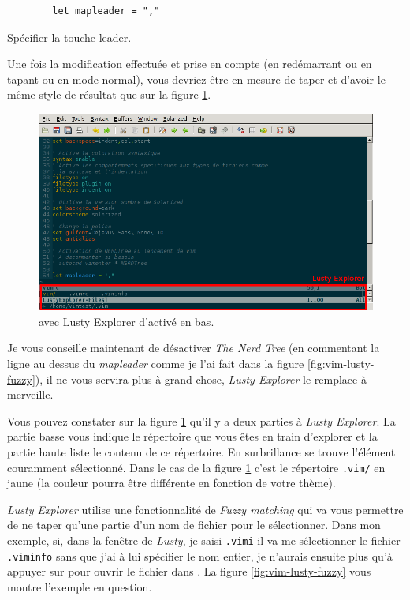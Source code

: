 \begin{listing}[H]

    \begin{verbatim}
        let mapleader = ","
    \end{verbatim}
    \caption{Spécifier la touche leader.}
    \label{code:leader}
\end{listing}

Une fois la modification effectuée et prise en compte (en redémarrant \vim ou en tapant  ou  en mode normal), vous devriez être en mesure de taper  et d'avoir le même style de résultat que sur la figure \ref{fig:vim-lusty}.

\begin{figure}%
  \includegraphics[width=\linewidth]{graphics/vim-lusty.png}
  \caption{\vim avec Lusty Explorer d'activé en bas.}
  \label{fig:vim-lusty}
\end{figure}

Je vous conseille maintenant de désactiver \emph{The Nerd Tree} (en commentant la ligne au dessus du \emph{mapleader} comme je l'ai fait dans la figure \ref{fig:vim-lusty-fuzzy}), il ne vous servira plus à grand chose, \emph{Lusty Explorer} le remplace à merveille.

Vous pouvez constater sur la figure \ref{fig:vim-lusty} qu'il y a deux parties à \emph{Lusty Explorer}. La partie basse vous indique le répertoire que vous êtes en train d'explorer et la partie haute liste le contenu de ce répertoire. En surbrillance se trouve l'élément couramment sélectionné. Dans le cas de la figure \ref{fig:vim-lusty} c'est le répertoire \Verb|.vim/| en jaune  (la couleur pourra être différente en fonction de votre thème).

\emph{Lusty Explorer} utilise une fonctionnalité de \emph{Fuzzy matching} qui va vous permettre de ne taper qu'une partie d'un nom de fichier pour le sélectionner. Dans mon exemple, si, dans la fenêtre de \emph{Lusty}, je saisi \Verb|.vimi| il va me sélectionner le fichier \Verb|.viminfo| sans que j'ai à lui spécifier le nom entier, je n'aurais ensuite plus qu'à appuyer sur \ttenter pour ouvrir le fichier dans \vim. La figure \ref{fig:vim-lusty-fuzzy} vous montre l'exemple en question.

